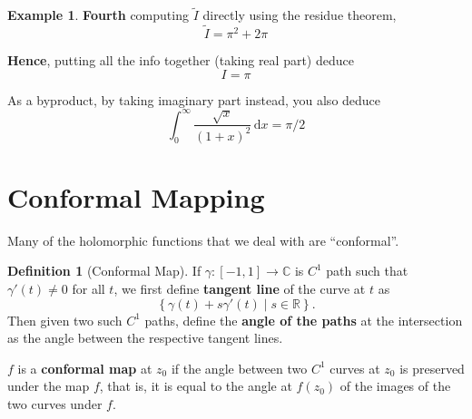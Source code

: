 \documentclass[a4paper, 12pt]{article}
\theoremstyle{definition}
\newtheorem{definition}{Definition}
\newtheorem{example}{Example}
\numberwithin{theorem}{section}
\numberwithin{definition}{section}
\numberwithin{exercise}{section}
\numberwithin{remark}{section}
\numberwithin{figure}{section}
\numberwithin{example}{section}
\newcommand{\R}{\mathbb{R}}
\newcommand{\C}{\mathbb{C}}
\newcommand{\intd}{\,\text{d}}
\begin{document}
\begin{example}
    \textbf{Fourth}
    computing $\tilde I$ directly using the residue theorem,
    \begin{equation*}
        \tilde I = \pi^2 + 2\pi
    \end{equation*}

    \textbf{Hence},
    putting all the info together (taking real part)
    deduce
    \begin{equation*}
        I = \pi
    \end{equation*}

    As a byproduct, by taking imaginary part instead, you also deduce
    \begin{equation*}
        \int_{0}^{\infty} \frac{\sqrt{x}}{\left( 1+x \right)^2} \intd x = \pi / 2
    \end{equation*}
\end{example}

\section{Conformal Mapping}
Many of the holomorphic functions that we deal with are ``conformal''.
\begin{definition}[Conformal Map]
    If $\gamma:[-1,1]\rightarrow \C$ is $C^1$ path such that $\gamma'(t) \neq 0$ for all $t$,
    we first define \textbf{tangent line} of the curve at $t$ as
    \begin{equation*}
        \left\{ \gamma(t) + s \gamma'(t) \middle| s \in \R \right\}.
    \end{equation*}
    Then given two such $C^1$ paths, define the \textbf{angle of the paths} at the intersection
    as the angle between the respective tangent lines.

    $f$ is a \textbf{conformal map} at $z_0$ if the angle between two $C^1$ curves at $z_0$
    is preserved under the map $f$, that is, it is equal to the angle at $f(z_0)$ of the images
    of the two curves under $f$.
\end{definition}
\end{document}
